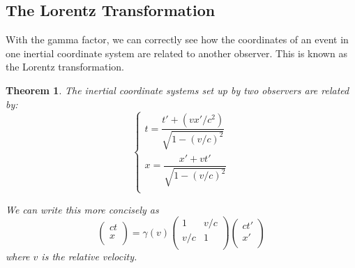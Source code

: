 \documentclass[12pt]{article}
\newtheorem{thm}{Theorem}
\theoremstyle{defn}
\theoremstyle{pf}
\newcommand{\0}{\emptyset}
\renewcommand{\-}{\setminus}
\begin{document}
\subsection{The Lorentz Transformation}
With the gamma factor, we can correctly see how the coordinates of an event in one inertial coordinate system are related to another observer. This is known as the Lorentz transformation.
\begin{thm}\label{lor_trans}The inertial coordinate systems set up by two observers are related by:
$$\begin{cases}
t=\dfrac{t'+(vx'/c^2)}{\sqrt{1-(v/c)^2}}\\
x=\dfrac{x'+vt'}{\sqrt{1-(v/c)^2}}\\
\end{cases}
$$

We can write this more concisely as
\begin{equation}\label{lt}
\left(\begin{array}{c}
      ct\\
x\\
      \end{array}\right)=\gamma(v)\left(\begin{array}{cc}
      1 & v/c\\
v/c & 1\\
      \end{array}\right)\left(\begin{array}{c}
      ct'\\
x'\\
      \end{array}\right)
\end{equation}
where $v$ is the relative velocity.
\end{thm}
\end{document}
